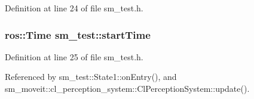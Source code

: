 Definition at line 24 of file sm\+\_\+test.\+h.

\subsubsection[{\texorpdfstring{start\+Time}{startTime}}]{\setlength{\rightskip}{0pt plus 5cm}ros\+::\+Time sm\+\_\+test\+::start\+Time}\hypertarget{namespacesm__test_aa99c742599f6e6c98f883ce4c03f743b}{}\label{namespacesm__test_aa99c742599f6e6c98f883ce4c03f743b}


Definition at line 25 of file sm\+\_\+test.\+h.



Referenced by sm\+\_\+test\+::\+State1\+::on\+Entry(), and sm\+\_\+moveit\+::cl\+\_\+perception\+\_\+system\+::\+Cl\+Perception\+System\+::update().

